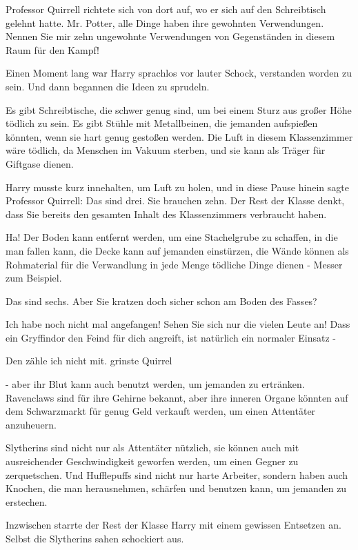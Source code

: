 Professor Quirrell richtete sich von dort auf, wo er sich auf den Schreibtisch
gelehnt hatte. \glqq Mr. Potter, alle Dinge haben ihre gewohnten Verwendungen.
Nennen Sie mir zehn ungewohnte Verwendungen von Gegenständen in diesem Raum für
den Kampf!\grqq{}

Einen Moment lang war Harry sprachlos vor lauter Schock, verstanden worden zu
sein. Und dann begannen die Ideen zu sprudeln.

\glqq Es gibt Schreibtische, die schwer genug sind, um bei einem Sturz aus
großer Höhe tödlich zu sein. Es gibt Stühle mit Metallbeinen, die jemanden
aufspießen könnten, wenn sie hart genug gestoßen werden. Die Luft in diesem
Klassenzimmer wäre tödlich, da Menschen im Vakuum sterben, und sie kann als
Träger für Giftgase dienen.\grqq{}

Harry musste kurz innehalten, um Luft zu holen, und in diese Pause hinein sagte
Professor Quirrell: \glqq Das sind drei. Sie brauchen zehn. Der Rest der Klasse
denkt, dass Sie bereits den gesamten Inhalt des Klassenzimmers verbraucht
haben.\grqq{}

\glqq Ha! Der Boden kann entfernt werden, um eine Stachelgrube zu schaffen, in
die man fallen kann, die Decke kann auf jemanden einstürzen, die Wände können
als Rohmaterial für die Verwandlung in jede Menge tödliche Dinge dienen - Messer
zum Beispiel.\grqq{}

\glqq Das sind sechs. Aber Sie kratzen doch sicher schon am Boden des
Fasses?\grqq{}

\glqq Ich habe noch nicht mal angefangen! Sehen Sie sich nur die vielen Leute
an! Dass ein Gryffindor den Feind für dich angreift, ist natürlich ein normaler
Einsatz -\grqq{}

\glqq Den zähle ich nicht mit.\grqq{} grinste Quirrel

\glqq - aber ihr Blut kann auch benutzt werden, um jemanden zu ertränken.
Ravenclaws sind für ihre Gehirne bekannt, aber ihre inneren Organe könnten auf
dem Schwarzmarkt für genug Geld verkauft werden, um einen Attentäter anzuheuern.

Slytherins sind nicht nur als Attentäter nützlich, sie können auch mit
ausreichender Geschwindigkeit geworfen werden, um einen Gegner zu zerquetschen.
Und Hufflepuffs sind nicht nur harte Arbeiter, sondern haben auch Knochen, die
man herausnehmen, schärfen und benutzen kann, um jemanden zu erstechen.\grqq{}

Inzwischen starrte der Rest der Klasse Harry mit einem gewissen Entsetzen an.
Selbst die Slytherins sahen schockiert aus.

